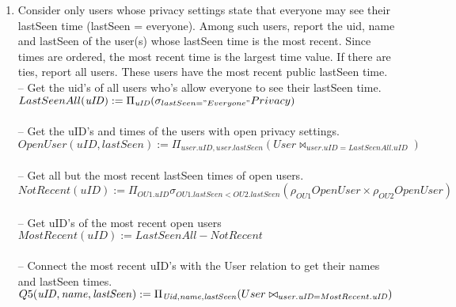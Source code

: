 \documentclass{article}
\newcommand{\var}[1]{\mathit{#1}}
\begin{document}
\begin{enumerate}
\item   %
Consider only users whose privacy settings state that everyone may see their lastSeen time (lastSeen = everyone). Among such users, report the uid, name and lastSeen of the user(s) whose lastSeen time is the most recent. Since times are ordered, the most recent time is the largest time value. If there are ties, report all users. These users have the most recent public lastSeen time. \\ [5pt]
{\large
\hspace*{1cm} -- Get the uid's of all users who's allow everyone to see their lastSeen time. \\ [5pt]
$
LastSeenAll(\var{uID}) :=
	\Pi_{\var{\var{uID}}}
	(\sigma_{lastSeen = "Everyone"} Privacy)
$ \\\\
\hspace*{1cm} -- Get the uID's and times of the users with open privacy settings. \\ [5pt]
$
OpenUser(uID, lastSeen) := 
	\Pi_{user.uID, user.lastSeen}
	(User \bowtie_{user.uID = LastSeenAll.uID})
$\\\\
\hspace*{1cm} -- Get all but the most recent lastSeen times of open users. \\ [5pt]
$
NotRecent(\var{uID}) := \Pi_{\var{OU1.uID}}
	\sigma_{OU1.\var{lastSeen} < OU2.\var{lastSeen}}
	(\rho_{OU1}OpenUser \times \rho_{OU2}OpenUser)
$\\\\
\hspace*{1cm} -- Get uID's of the most recent open users \\ [5pt]
$
MostRecent(\var{uID}) := LastSeenAll - NotRecent
$\\\\
\hspace*{1cm} -- Connect the most recent uID's with the User relation to get their names and lastSeen times. \\ [5pt]
$
Q5(\var{uID}, \var{name}, \var{lastSeen}) := 
	\Pi_{\var{Uid}, \var{name}, \var{lastSeen}} 
	(User \bowtie_{user.\var{uID} = MostRecent.\var{uID}}) \\ 
$
}


\end{enumerate}
\end{document}
